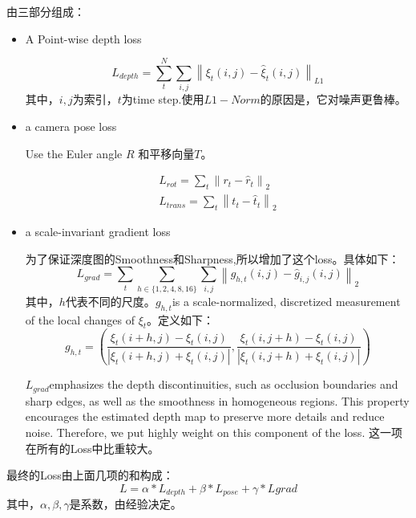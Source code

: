 由三部分组成：
\begin{itemize}
\item A Point-wise depth loss

\begin{displaymath}
L_{depth} = \sum_{t}^{N}\sum_{i, j}\left\| \xi_t(i, j) - \hat{\xi}_t(i, j) \right\|_{L1}
\end{displaymath}
其中，$i, j$为索引，$t$为time step.使用$L1-Norm$的原因是，它对噪声更鲁棒。

\item a camera pose loss

Use the Euler angle $R$ 和平移向量$T$。

\begin{displaymath}
\begin{gathered}
L_{rot} = \sum_{t}\left\| r_t - \hat{r}_t \right\|_2 \\
L_{trans} = \sum_{t}\left\| t_t - \hat{t}_t \right\|_2
\end{gathered}
\end{displaymath}

\item a scale-invariant gradient loss

为了保证深度图的Smoothness和Sharpness,所以增加了这个loss。具体如下：
\begin{displaymath}
L_{grad} = \sum_{t}\sum_{h\in\{ 1, 2, 4, 8, 16 \}}\sum_{i, j}\left\| g_{h, t}(i, j) - \hat{g}_{i, j}(i, j)\right\|_2
\end{displaymath}
其中，$h$代表不同的尺度。$g_{h, t}$is a scale-normalized, discretized measurement of the local changes of $\xi_t$。定义如下：
\begin{displaymath}
g_{h, t} = \left( \frac{\xi_t(i+h, j) - \xi_t(i, j)}{|\xi_t(i + h, j) + \xi_t(i, j)|}, \frac{\xi_t(i, j+h) - \xi_t(i, j)}{|\xi_t(i, j+h) + \xi_t(i, j)|}    \right)
\end{displaymath}

$L_{grad}$emphasizes the depth discontinuities, such as occlusion
boundaries and sharp edges, as well as the smoothness in homogeneous regions.
This property encourages the estimated depth map to preserve more details and
reduce noise. Therefore, we put highly weight on this component of the loss. 这一项在所有的Loss中比重较大。

\end{itemize}

最终的Loss由上面几项的和构成：
\begin{displaymath}
L = \alpha * L_{depth} + \beta * L_{pose} + \gamma * L{grad}
\end{displaymath}
其中，$\alpha, \beta, \gamma$是系数，由经验决定。


